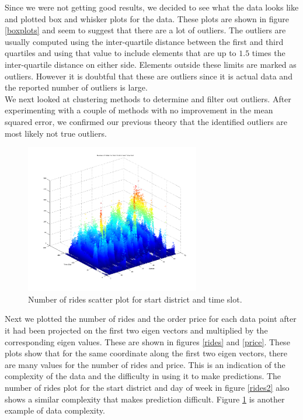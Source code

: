 \documentclass[paper=a4, fontsize=11pt]{scrartcl} %
\numberwithin{equation}{section} %
\numberwithin{table}{section} %
\begin{document}
Since we were not getting good results, we decided to see what the data looks like and plotted box and whisker plots for the data. These plots are shown in figure \ref{boxplots} and seem to suggest that there are a lot of outliers. The outliers are usually computed using the inter-quartile distance between the first and third quartiles and using that value to include elements that are up to $1.5$ times the inter-quartile distance on either side. Elements outside these limits are marked as outliers. However it is doubtful that these are outliers since it is actual data and the reported number of outliers is large.  \\

We next looked at clustering methods to determine and filter out outliers.  After experimenting with a couple of methods with no improvement in the mean squared error, we confirmed our previous theory that the identified outliers are most likely not true outliers. \\

\begin{figure}[!htb]
\centering
\includegraphics[width=3in]{figures/NumberofRidesforDistrictandTimeSlot.png}
\caption{Number of rides scatter plot for start district and time slot.}
\label{rides3}
\end{figure}

Next we plotted the number of rides and the order price for each data point after it had been projected on the first two eigen vectors and multiplied by the corresponding eigen values. These are shown in figures \ref{rides} and \ref{price}. These plots show that for the same coordinate along the first two eigen vectors, there are many values for the number of rides and price. This is an indication of the complexity of the data and the difficulty in using it to make predictions. The number of rides plot for the start district and day of week in figure \ref{rides2} also shows a similar complexity that makes prediction difficult. Figure \ref{rides3} is another example of data complexity. \\
\end{document}
